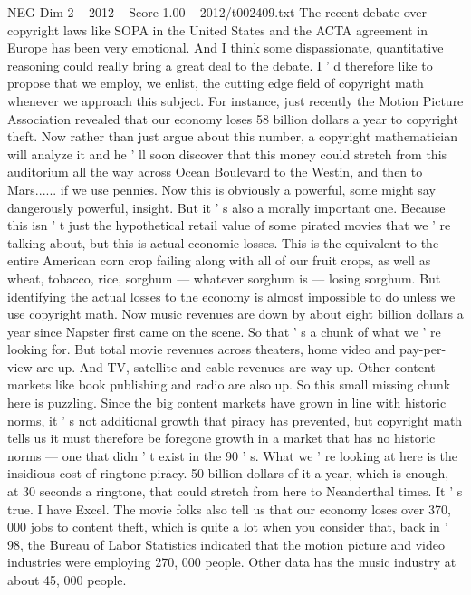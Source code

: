 \begin{textsample}{NEG Dim 2 – 2012 – Score 1.00 – 2012/t002409.txt}  \label{ex:f2_neg_028}
The recent debate over copyright laws like SOPA in the United States and the ACTA agreement in Europe has been very emotional.
And I think some dispassionate, quantitative reasoning could really bring a great deal to the debate.
I ' d therefore like to propose that we employ, we enlist, the cutting edge field of copyright math whenever we approach this subject.
For instance, just recently the Motion Picture Association revealed that our economy loses 58 billion dollars a year to copyright theft.
Now rather than just argue about this number, a copyright mathematician will analyze it and he ' ll soon discover that this money could stretch from this auditorium all the way across Ocean Boulevard to the Westin, and then to Mars...... if we use pennies.
Now this is obviously a powerful, some might say dangerously powerful, insight.
But it ' s also a morally important one.
Because this isn ' t just the hypothetical retail value of some pirated movies that we ' re talking about, but this is actual economic losses.
This is the equivalent to the entire American corn crop failing along with all of our fruit crops, as well as wheat, tobacco, rice, sorghum — whatever sorghum is — losing sorghum.
But identifying the actual losses to the economy is almost impossible to do unless we use copyright math.
Now music revenues are down by about eight billion dollars a year since Napster first came on the scene.
So that ' s a chunk of what we ' re looking for.
But total movie revenues across theaters, home video and pay-per-view are up.
And TV, satellite and cable revenues are way up.
Other content markets like book publishing and radio are also up.
So this small missing chunk here is puzzling.
Since the big content markets have grown in line with historic norms, it ' s not additional growth that piracy has prevented, but copyright math tells us it must therefore be foregone growth in a market that has no historic norms — one that didn ' t exist in the 90 ' s.
What we ' re looking at here is the insidious cost of ringtone piracy. 50 billion dollars of it a year, which is enough, at 30 seconds a ringtone, that could stretch from here to Neanderthal times.
It ' s true.
I have Excel.
The movie folks also tell us that our economy loses over 370, 000 jobs to content theft, which is quite a lot when you consider that, back in ' 98, the Bureau of Labor Statistics indicated that the motion picture and video industries were employing 270, 000 people.
Other data has the music industry at about 45, 000 people.

\end{textsample}
